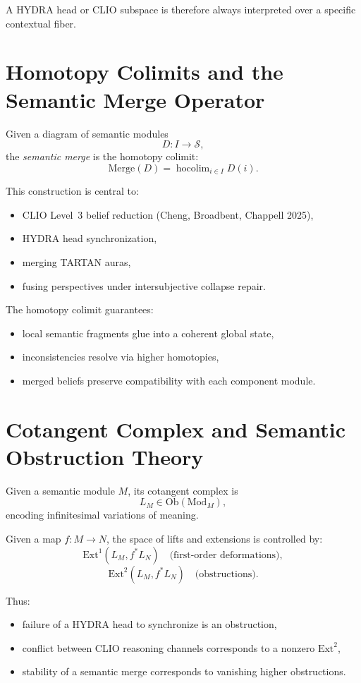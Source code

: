 \documentclass[12pt,oneside]{book}
\theoremstyle{plain}
\theoremstyle{definition}
\begin{document}
A HYDRA head or CLIO subspace is therefore always interpreted over a specific contextual fiber.

\section{Homotopy Colimits and the Semantic Merge Operator}

Given a diagram of semantic modules
\[
D: I \to \mathcal{S},
\]
the \emph{semantic merge} is the homotopy colimit:
\[
\mathrm{Merge}(D) = \operatorname{hocolim}_{i \in I} D(i).
\]

This construction is central to:
\begin{itemize}
  \item CLIO Level~3 belief reduction (Cheng, Broadbent, Chappell 2025),
  \item HYDRA head synchronization,
  \item merging TARTAN auras,
  \item fusing perspectives under intersubjective collapse repair.
\end{itemize}

The homotopy colimit guarantees:
\begin{itemize}
  \item local semantic fragments glue into a coherent global state,
  \item inconsistencies resolve via higher homotopies,
  \item merged beliefs preserve compatibility with each component module.
\end{itemize}

\section{Cotangent Complex and Semantic Obstruction Theory}

Given a semantic module $M$, its cotangent complex is
\[
L_M \in \mathrm{Ob}(\mathrm{Mod}_M),
\]
encoding infinitesimal variations of meaning.

Given a map $f: M \to N$, the space of lifts and extensions is controlled by:
\[
\mathrm{Ext}^1(L_M, f^*L_N) 
\quad \text{(first-order deformations)},
\]
\[
\mathrm{Ext}^2(L_M, f^*L_N)
\quad \text{(obstructions)}.
\]

Thus:
\begin{itemize}
  \item failure of a HYDRA head to synchronize is an obstruction,
  \item conflict between CLIO reasoning channels corresponds to a nonzero $\mathrm{Ext}^2$,
  \item stability of a semantic merge corresponds to vanishing higher obstructions.
\end{itemize}
\end{document}
